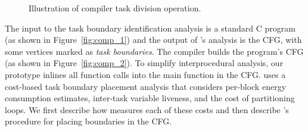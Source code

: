 \begin{figure}
	\centering
	\caption{Illustration of \sys compiler task division operation.}
	\label{fig:compiler_overview}
\end{figure}

The input to the task boundary identification analysis is a standard C program
(as shown in Figure~\ref{fig:comp_1}) and the output of \sys's analysis is the
CFG, with some vertices marked as {\em task boundaries}. 
%
The \sys compiler builds the program's CFG (as shown in
Figure~\ref{fig:comp_2}).  To simplify interprocedural analysis, our prototype
inlines all function calls into the main function in the CFG. 
%
\sys uses a cost-based task boundary placement analysis that
considers per-block energy consumption estimates, inter-task variable liveness,
and the cost of partitioning loops.  We first describe how \sys measures each of these costs 
and then describe \sys's procedure for placing boundaries in the CFG.


